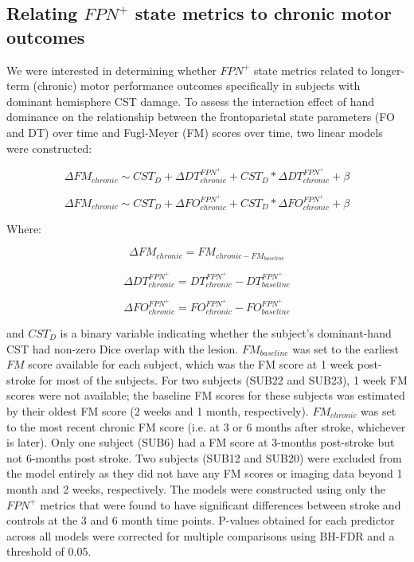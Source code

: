 \documentclass[phd,tocprelim]{cornell}
\begin{document}
	 \subsection*{Relating $FPN^+$ state metrics to chronic motor  outcomes}
     We were interested in determining whether $FPN^+$ state metrics related to longer-term (chronic) motor performance outcomes specifically in subjects with dominant hemisphere CST damage. To assess the interaction effect of hand dominance on the relationship between the frontoparietal state parameters (FO and DT) over time and Fugl-Meyer (FM) scores over time, two linear models were constructed:

     \begin{center}
	 \begin{equation}
	    \Delta FM_{chronic} \sim  CST_D + \Delta DT^{FPN^+}_{chronic} + CST_D*\Delta DT^{FPN^+}_{chronic} + \beta
	\end{equation} 

	 \begin{equation}
	    \Delta FM_{chronic} \sim  CST_D + \Delta FO^{FPN^+}_{chronic} + CST_D*\Delta FO^{FPN^+}_{chronic} + \beta  
	\end{equation}
	\end{center}
	Where:
	\begin{center}

	\begin{equation}
	    \Delta FM_{chronic}  = FM_{chronic - FM_{baseline}} 
	\end{equation}

	\begin{equation}
	    \Delta DT^{FPN^+}_{chronic}  = DT^{FPN^+}_{chronic}-DT^{FPN^+}_{baseline} 
	\end{equation}

	\begin{equation}
	    \Delta FO^{FPN^+}_{chronic}  = FO^{FPN^+}_{chronic}-FO^{FPN^+}_{baseline} 
	\end{equation}
	\end{center}

	and $CST_D$ is a binary variable indicating whether the subject's dominant-hand CST had non-zero Dice overlap with the lesion. $FM_{baseline}$ was set to the earliest $FM$ score available for each subject, which was the FM score at 1 week post-stroke for most of the subjects. For two subjects (SUB22 and SUB23), 1 week FM scores were not available; the baseline FM scores for these subjects was estimated by their oldest FM score (2 weeks and 1 month, respectively). $FM_{chronic}$ was set to the most recent chronic FM score (i.e. at 3 or 6 months after stroke, whichever is later). Only one subject (SUB6) had a FM score at 3-months post-stroke but not 6-months post stroke. Two subjects (SUB12 and SUB20) were excluded from the model entirely as they did not have any FM scores or imaging data beyond 1 month and 2 weeks, respectively. The models were constructed using only the $FPN^+$ metrics that were found to have significant differences between stroke and controls at the 3 and 6 month time points. P-values obtained for each predictor across all models were corrected for multiple comparisons using BH-FDR and a threshold of 0.05.
	
\end{document}

